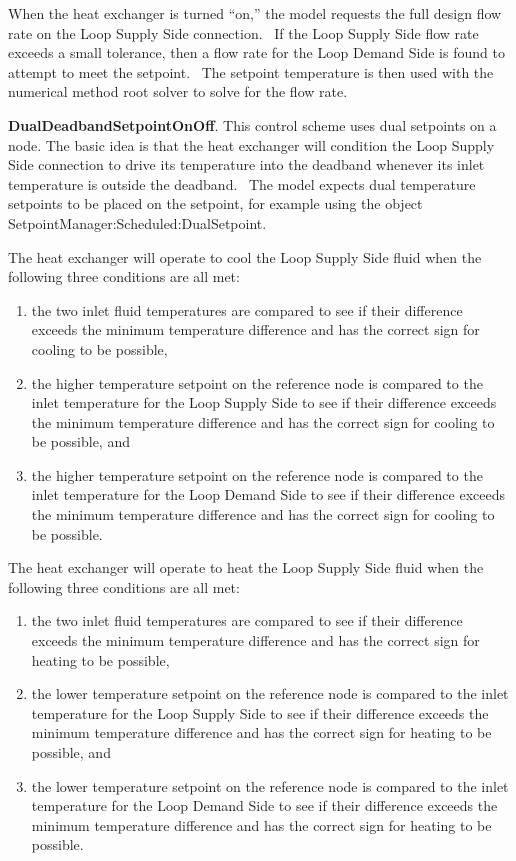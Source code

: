 When the heat exchanger is turned ``on,'' the model requests the full design flow rate on the Loop Supply Side connection.~ If the Loop Supply Side flow rate exceeds a small tolerance, then a flow rate for the Loop Demand Side is found to attempt to meet the setpoint.~ The setpoint temperature is then used with the numerical method root solver to solve for the flow rate.

\textbf{DualDeadbandSetpointOnOff}. This control scheme uses dual setpoints on a node. The basic idea is that the heat exchanger will condition the Loop Supply Side connection to drive its temperature into the deadband whenever its inlet temperature is outside the deadband.~ The model expects dual temperature setpoints to be placed on the setpoint, for example using the object SetpointManager:Scheduled:DualSetpoint.

The heat exchanger will operate to cool the Loop Supply Side fluid when the following three conditions are all met:

\begin{enumerate}
\def\labelenumi{\arabic{enumi})}
\tightlist
\item the two inlet fluid temperatures are compared to see if their difference exceeds the minimum temperature difference and has the correct sign for cooling to be possible,
\item the higher temperature setpoint on the reference node is compared to the inlet temperature for the Loop Supply Side to see if their difference exceeds the minimum temperature difference and has the correct sign for cooling to be possible, and
\item the higher temperature setpoint on the reference node is compared to the inlet temperature for the Loop Demand Side to see if their difference exceeds the minimum temperature difference and has the correct sign for cooling to be possible.
\end{enumerate}

The heat exchanger will operate to heat the Loop Supply Side fluid when the following three conditions are all met:

\begin{enumerate}
\def\labelenumi{\arabic{enumi})}
\tightlist
\item the two inlet fluid temperatures are compared to see if their difference exceeds the minimum temperature difference and has the correct sign for heating to be possible,
\item the lower temperature setpoint on the reference node is compared to the inlet temperature for the Loop Supply Side to see if their difference exceeds the minimum temperature difference and has the correct sign for heating to be possible, and
\item the lower temperature setpoint on the reference node is compared to the inlet temperature for the Loop Demand Side to see if their difference exceeds the minimum temperature difference and has the correct sign for heating to be possible.
\end{enumerate}

